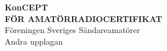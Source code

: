 \AddToShipoutPicture*{\BackgroundPic}

\pagestyle{empty}



\onecolumn
\vspace{3cm}
\begin{center}
{\fontsize{2.4cm}{2.88cm}\bfseries{\color{white}KonCEPT}} \\[2ex]
\Large{\bfseries{\color{white}FÖR AMATÖRRADIOCERTIFIKAT}} \\[2ex]
\huge{\color{white}Föreningen Sveriges Sändareamatörer} \\
\Large{\color{white}Andra upplagan}
\end{center}
\twocolumn

\clearpage
